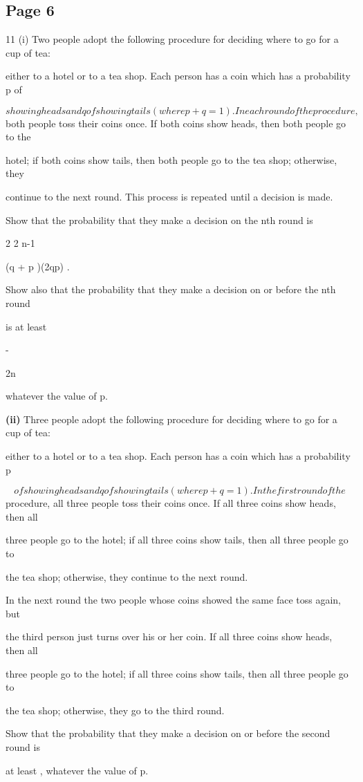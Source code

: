 \documentclass[12pt]{article}
\begin{document}
\subsection*{Page 6}
\begin{flushleft}
11 (i) Two people adopt the following procedure for deciding where to go for a cup of tea:\par
either to a hotel or to a tea shop. Each person has a coin which has a probability p of\par
\[showing heads and q of showing tails (where p+q = 1). In each round of the procedure,\]
both people toss their coins once. If both coins show heads, then both people go to the\par
hotel; if both coins show tails, then both people go to the tea shop; otherwise, they\par
continue to the next round. This process is repeated until a decision is made.\par
Show that the probability that they make a decision on the nth round is\par
2 2 n-1\par
(q + p )(2qp) .\par
Show also that the probability that they make a decision on or before the nth round\par
is at least\par
-\par
2n\par
whatever the value of p.\par
\textbf{(ii)} Three people adopt the following procedure for deciding where to go for a cup of tea:\par
either to a hotel or to a tea shop. Each person has a coin which has a probability p\par
\[of showing heads and q of showing tails (where p + q = 1). In the first round of the\]
procedure, all three people toss their coins once. If all three coins show heads, then all\par
three people go to the hotel; if all three coins show tails, then all three people go to\par
the tea shop; otherwise, they continue to the next round.\par
In the next round the two people whose coins showed the same face toss again, but\par
the third person just turns over his or her coin. If all three coins show heads, then all\par
three people go to the hotel; if all three coins show tails, then all three people go to\par
the tea shop; otherwise, they go to the third round.\par
Show that the probability that they make a decision on or before the second round is\par
at least , whatever the value of p.\par
\end{flushleft}
\end{document}
